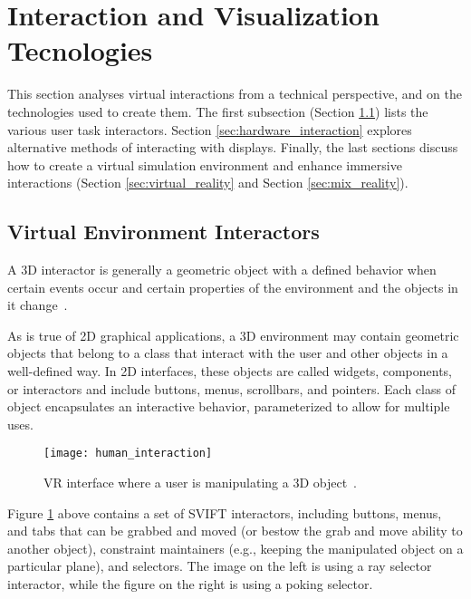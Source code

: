 \section{Interaction and Visualization Tecnologies}
\label{sec:interaction_visualization}

This section analyses virtual interactions from a technical perspective, and on the technologies used to create them.
The first subsection (Section \ref{sec:interactors}) lists the various user task interactors. 
Section \ref{sec:hardware_interaction} explores alternative methods of interacting with displays. 
Finally, the last sections discuss how to create a virtual simulation environment and enhance immersive interactions (Section \ref{sec:virtual_reality} and Section  \ref{sec:mix_reality}).

\subsection{Virtual Environment Interactors}
\label{sec:interactors}


A \gls{3D} interactor is generally a geometric object with a defined behavior when certain events 
occur and certain properties of the environment and the objects in it change~\cite{hale2014handbook}.

As is true of \gls{2D} graphical applications, a \gls{3D} environment may contain geometric objects that 
belong to a class that interact with the user and other objects in a well-defined way. In \gls{2D} interfaces, 
these objects are called widgets, components, or interactors and include buttons, menus, scrollbars, 
and pointers. Each class of object encapsulates an interactive behavior, parameterized to allow for 
multiple uses. 



\begin{figure}[h!]
    \centering
    \texttt{[image: human\_interaction]}
    \caption{\gls{VR} interface where a user is manipulating a \gls{3D} object~\cite{hale2014handbook}.} %
    \label{fig:human_interaction}
\end{figure}
\FloatBarrier




Figure \ref{fig:human_interaction} above contains a set of \gls{SVIFT} interactors, including buttons, menus, and tabs
that can be grabbed and moved (or bestow the grab and move ability to another object), constraint maintainers 
(e.g., keeping the manipulated object on a particular plane), and selectors. The image on the left is using a 
ray selector interactor, while the figure on the right is using a poking selector.


